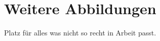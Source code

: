 {}
{} %
\chapter{Weitere Abbildungen}
\label{cptr:Weitere Abbildungen}
Platz für alles was nicht so recht in Arbeit passt.\par\bigskip

